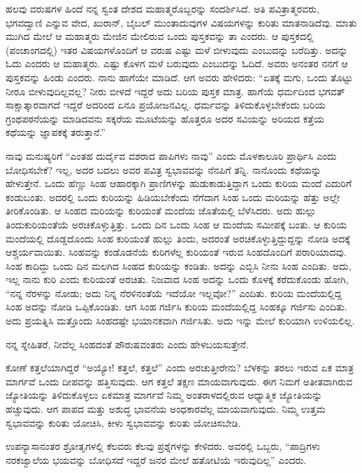 ಹಲವು ವರುಷಗಳ ಹಿಂದೆ ನನ್ನ ಸ್ವಂತ ದೇಶದ ಮಹಾತ್ಮರೊಬ್ಬರನ್ನು ಸಂದರ್ಶಿಸಿದೆ. ಅತಿ ಪವಿತ್ರಾತ್ಮರವರು, ಭಗವದ್ವಾಣಿ ಎನ್ನುವ ವೇದ, ಖುರಾನ್, ಬೈಬಲ್ ಮುಂತಾದು\-ವುಗಳ ವಿಷಯಗಳನ್ನು ಕುರಿತು ಮಾತನಾಡಿದೆವು. ಮಾತು ಮುಗಿದ ಮೇಲೆ ಆ ಮಹಾತ್ಮರು ಮೇಜಿನ ಮೇಲಿರುವ ಒಂದು ಪುಸ್ತಕವನ್ನು ತಾ ಎಂದರು. ಆ ಪುಸ್ತಕದಲ್ಲಿ (ಪಂಚಾಂಗದಲ್ಲಿ) ಇತರ ವಿಷಯಗಳೊಂದಿಗೆ ಆ ವರುಷ ಎಷ್ಟು ಮಳೆ ಬೀಳುವುದು ಎಂಬುದನ್ನು ಬರೆದಿತ್ತು. ಅದನ್ನು ಓದು ಎಂದರು ಆ ಮಹಾತ್ಮರು. ಎಷ್ಟು ಕೊಳಗ ಮಳೆ ಬರುವುದು ಎಂಬುದನ್ನು ಓದಿದೆ. ಅವರು ಅನಂತರ ನನಗೆ ಆ ಪುಸ್ತಕವನ್ನು ಹಿಂಡು ಎಂದರು. ನಾನು ಹಾಗೆಯೇ ಮಾಡಿದೆ. ಆಗ ಅವರು ಹೇಳಿದರು: “ಏತಕ್ಕೆ ಮಗು, ಒಂದು ತೊಟ್ಟು ನೀರೂ ಬೀಳುವುದಿಲ್ಲವಲ್ಲ? ನೀರು ಬೀಳದೆ ಇದ್ದರೆ ಅದು ಬರಿಯ ಪುಸ್ತಕ ಮಾತ್ರ. ಹಾಗೆಯೆ ಧರ್ಮದಿಂದ ಭಗವತ್ ಸಾಕ್ಷಾತ್ಕಾರವಾಗದೆ ಇದ್ದರೆ ಅದರಿಂದ ಏನೂ ಪ್ರಯೋಜನವಿಲ್ಲ. ಧರ್ಮವನ್ನು ತಿಳಿದುಕೊಳ್ಳಬೇಕೆಂದು ಬರಿಯ ಗ್ರಂಥಪಠನೆಯನ್ನು ಮಾಡಿದವನು ಸಕ್ಕರೆಯ ಮೂಟೆಯನ್ನು ಹೊತ್ತರೂ ಅದರ ಸವಿಯನ್ನು ಅರಿಯದ ಕತ್ತೆಯ ಕಥೆಯನ್ನು ಜ್ಞಾಪಕಕ್ಕೆ ತರುತ್ತಾನೆ.”

ನಾವು ಮನುಷ್ಯರಿಗೆ “ಎಂತಹ ದುರ್ದೈವ ವಶರಾದ ಪಾಪಿಗಳು ನಾವು'' ಎಂದು ಮೊಳಕಾಲೂರಿ ಪ್ರಾರ್ಥಿಸಿ ಎಂದು ಬೋಧಿಸಬೇಕೆ? ಇಲ್ಲ, ಅದರ ಬದಲು ಅವರ ಪವಿತ್ರ ಸ್ವಭಾವವನ್ನು ನೆನಪಿಗೆ ತನ್ನಿ. ನಾನೊಂದು ಕಥೆಯನ್ನು ಹೇಳುತ್ತೇನೆ. ಒಂದು ಹೆಣ್ಣು ಸಿಂಹ ಆಹಾರಕ್ಕಾಗಿ ಪ್ರಾಣಿಗಳನ್ನು ಹುಡುಕಾಡುತ್ತಿದ್ದಾಗ ಒಂದು ಕುರಿಯ ಮಂದೆ ಎದುರಿಗೆ ಕಂಡುಬಂತು. ಅದರಲ್ಲಿ ಒಂದು ಕುರಿಯನ್ನು ಹಿಡಿಯಬೇಕೆಂದು ನೆಗೆದಾಗ ಸಿಂಹ ಒಂದು ಮರಿಯನ್ನು ಹೆತ್ತು ಅಲ್ಲೇ ತೀರಿಕೊಂಡಿತು. ಆ ಸಿಂಹದ ಮರಿಯನ್ನು ಕುರಿಯಂತೆ ಮಂದೆಯ ಜೊತೆಯಲ್ಲಿ ಬೆಳೆಸಿದರು. ಅದು ಹುಲ್ಲು ತಿಂದು\break ಕುರಿಯಂತೆಯೆ ಅರಚಿಕೊಳ್ಳುತ್ತಿತ್ತು. ಒಂದು ದಿನ ಒಂದು ಸಿಂಹ ಆ ಮಂದೆಯ ಸಮೀಪಕ್ಕೆ ಬಂತು. ಆ ಕುರಿಯ ಮಂದೆಯಲ್ಲಿ ದೊಡ್ಡದೊಂದು ಸಿಂಹ ಕುರಿಯಂತೆ ಹುಲ್ಲು ತಿಂದು, ಅದರಂತೆ ಅರಚಿಕೊಳ್ಳುತ್ತಿದ್ದುದ್ದನ್ನು ನೋಡಿ ಅದಕ್ಕೆ ಆಶ್ಚರ್ಯವಾಯಿತು. ಸಿಂಹವನ್ನು ಕಂಡೊಡನೆಯೆ ಕುರಿಗಳೆಲ್ಲ ಕುರಿಯಂತೆ ಇರುವ ಸಿಂಹದೊಂದಿಗೆ ಪರಾರಿಯಾದವು. ಸಿಂಹ ಕಾದಿದ್ದು ಒಂದು ದಿನ ಮಲಗಿದ ಸಿಂಹದ ಕುರಿಯನ್ನು ಕಂಡಿತು. ಅದನ್ನು ಎಬ್ಬಿಸಿ ನೀನು ಸಿಂಹ ಎಂದಿತು. ಅದು, ಇಲ್ಲ ನಾನು ಕುರಿ ಎಂದು ಕುರಿಯಂತೆ ಅರಚಿತು. ನಿಜವಾದ ಸಿಂಹ ಅದನ್ನು ಒಂದು ಕೊಳಕ್ಕೆ ಕರೆದುಕೊಂಡು ಹೋಗಿ, “ನನ್ನ ನೆರಳನ್ನು ನೋಡು; ಅದು ನಿನ್ನ ನೆರಳಿನಂತೆಯೆ ಇದೆಯೋ ಇಲ್ಲವೋ?'' ಎಂದಿತು. ಕುರಿಯ ಮಂದೆಯಲ್ಲಿದ್ದ ಸಿಂಹ ಅದನ್ನು ನೋಡಿ ಒಪ್ಪಿಕೊಂಡಿತು. ಆಗ ಸಿಂಹ ಗರ್ಜಿಸಿ ಕುರಿಯ ಮಂದೆಯಲ್ಲಿದ್ದ ಸಿಂಹಕ್ಕೂ ಗರ್ಜಿಸು ಎಂದಿತು. ಅದು ಪ್ರಯತ್ನಿಸಿ ಮತ್ತೊಂದು ಸಿಂಹದಷ್ಟೇ ಭಯಾನಕವಾಗಿ ಗರ್ಜಿಸಿತು. ಅದು ಇನ್ನು ಮೇಲೆ ಕುರಿಯಾಗಿ ಉಳಿಯಲಿಲ್ಲ.

ನನ್ನ ಸ್ನೇಹಿತರೆ, ನೀವೆಲ್ಲ ಸಿಂಹದಂತೆ ಪೌರುಷವಂತರು ಎಂದು ಹೇಳಬಯಸುತ್ತೇನೆ.

ಕೋಣೆ ಕತ್ತಲೆಯಾಗಿದ್ದರೆ “ಅಯ್ಯೋ! ಕತ್ತಲೆ, ಕತ್ತಲೆ'' ಎಂದು ಅರಚುತ್ತೀರೇನು? ಬೆಳಕನ್ನು ತರಲು ಇರುವ ಏಕ ಮಾತ್ರ ಮಾರ್ಗವೆ ಒಂದು ದೀಪವನ್ನು ಹತ್ತಿಸುವುದು. ಆಗ ಕತ್ತಲೆ ತಕ್ಷಣ ಮಾಯವಾಗುವುದು. ಈಗ ನಿಮಗೆ ಅತೀತವಾಗಿರುವ ಜ್ಯೋತಿಯನ್ನು ತಿಳಿದುಕೊಳ್ಳಲು ಏಕಮಾತ್ರ ಮಾರ್ಗವೆ ನಿಮ್ಮ ಅಂತರಾಳದಲ್ಲಿರುವ ಆಧ್ಯಾತ್ಮಿಕ ಜ್ಯೋತಿಯನ್ನು ಹಚ್ಚುವುದು. ಆಗ ಪಾಪದ ಮತ್ತು ಅಶುದ್ಧ ಭಾವನೆಯ ಅಂಧಕಾರವೆಲ್ಲ ಮಾಯವಾಗುವುದು. ನಿಮ್ಮ ಉತ್ತಮ ಸ್ವಭಾವವನ್ನು ಕುರಿತು ಯೋಚಿಸಿ, ಕೀಳು ಸ್ವಭಾವವನ್ನು ಕುರಿತು ಯೋಚಿಸಬೇಡಿ.

\delimiter

ಉಪನ್ಯಾಸಾನಂತರ ಶ್ರೋತೃಗಳಲ್ಲಿ ಕೆಲವರು ಕೆಲವು ಪ್ರಶ್ನೆಗಳನ್ನು ಕೇಳಿದರು. ಅವರಲ್ಲಿ ಒಬ್ಬರು, “ಪಾದ್ರಿಗಳು ನರಕಜ್ವಾಲೆಯ ಭಯವನ್ನು ಬೋಧಿಸದೆ ಇದ್ದರೆ ಜನರ ಮೇಲೆ ಹತೋಟಿಯೆ ಇರುವುದಿಲ್ಲ” ಎಂದರು.

